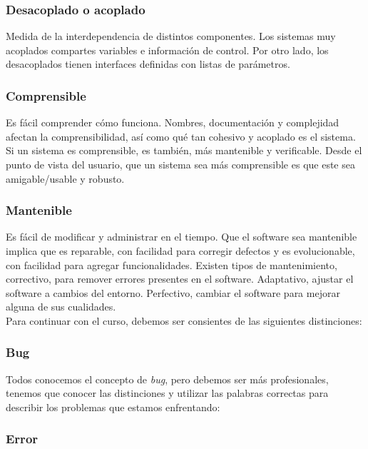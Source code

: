     \subsubsection*{Desacoplado o acoplado}

        Medida de la interdependencia de distintos componentes. Los sistemas muy acoplados compartes variables e información de control. Por otro lado, los desacoplados tienen interfaces definidas con listas de parámetros.
    
    \subsubsection*{Comprensible}

        Es fácil comprender cómo funciona. Nombres, documentación y complejidad afectan la comprensibilidad, así como qué tan cohesivo y acoplado es el sistema. Si un sistema es comprensible, es también, más mantenible y verificable. Desde el punto de vista del usuario, que un sistema sea más comprensible es que este sea amigable/usable y robusto.
    
    \subsubsection*{Mantenible}

        Es fácil de modificar y administrar en el tiempo. Que el software sea mantenible implica que es reparable, con facilidad para corregir defectos y es evolucionable, con facilidad para agregar funcionalidades. Existen tipos de mantenimiento, correctivo, para remover errores presentes en el software. Adaptativo, ajustar el software a cambios del entorno. Perfectivo, cambiar el software para mejorar alguna de sus cualidades.\\
    
    Para continuar con el curso, debemos ser consientes de las siguientes distinciones:
    
    \subsubsection*{Bug}

    Todos conocemos el concepto de \textit{bug}, pero debemos ser más profesionales, tenemos que conocer las distinciones y utilizar las palabras correctas para describir los problemas que estamos enfrentando:
    
    \subsubsection*{Error}

